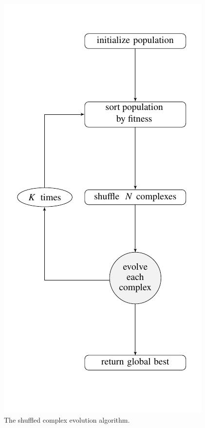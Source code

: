 \begin{figure}[!tbp]
\begin{minipage}[b]{0.4\textwidth}
    \includegraphics[width=\textwidth]{img/sce/flow1}
    \caption{The shuffled complex evolution algorithm.}
    \label{fig:flow1}
  \end{minipage}

\end{figure}
